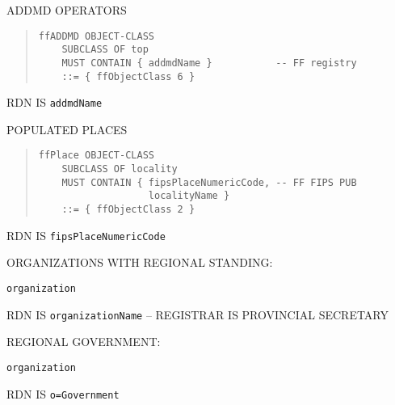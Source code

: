\begin{bwslide}

\begin{nrtc}
\item	ADDMD OPERATORS
\begin{quote}\begin{verbatim}
ffADDMD OBJECT-CLASS
    SUBCLASS OF top
    MUST CONTAIN { addmdName }           -- FF registry
    ::= { ffObjectClass 6 }
\end{verbatim}\end{quote}
RDN IS \verb"addmdName"
\end{nrtc}
\end{bwslide}


\begin{bwslide}

\begin{nrtc}
\item	POPULATED PLACES
\begin{quote}\begin{verbatim}
ffPlace OBJECT-CLASS
    SUBCLASS OF locality
    MUST CONTAIN { fipsPlaceNumericCode, -- FF FIPS PUB
                   localityName }
    ::= { ffObjectClass 2 }
\end{verbatim}\end{quote}
RDN IS \verb"fipsPlaceNumericCode"

\item	ORGANIZATIONS WITH REGIONAL STANDING:
    \begin{nrtc}
    \item	\verb"organization"
    \end{nrtc}
RDN IS \verb"organizationName" -- REGISTRAR IS PROVINCIAL SECRETARY

\item	REGIONAL GOVERNMENT:
    \begin{nrtc}
    \item	\verb"organization"
    \end{nrtc}
RDN IS \verb"o=Government"
\end{nrtc}
\end{bwslide}


